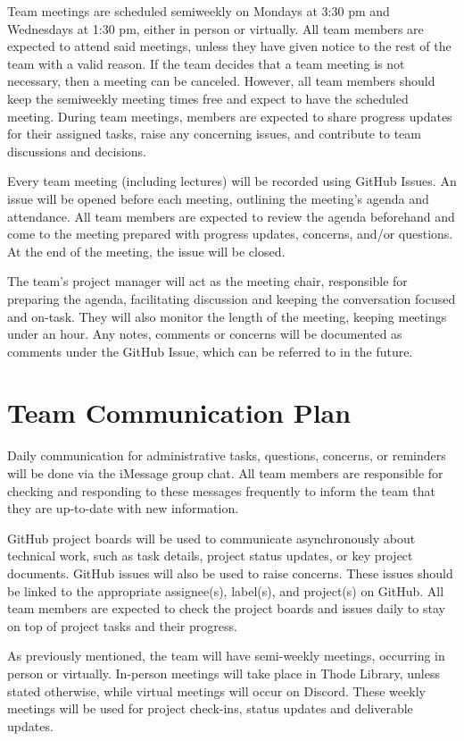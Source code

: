 \documentclass{article}
\begin{document}
	Team meetings are scheduled semiweekly on Mondays at 3:30 pm and Wednesdays at 1:30 pm, either in person or virtually. All team members are expected to attend said meetings, unless they have given notice to the rest of the team with a valid reason. If the team decides that a team meeting is not necessary, then a meeting can be canceled. However, all team members should keep the semiweekly meeting times free and expect to have the scheduled meeting. During team meetings, members are expected to share progress updates for their assigned tasks, raise any concerning issues, and contribute to team discussions and decisions.

	Every team meeting (including lectures) will be recorded using GitHub Issues. An issue will be opened before each meeting, outlining the meeting’s agenda and attendance. All team members are expected to review the agenda beforehand and come to the meeting prepared with progress updates, concerns, and/or questions. At the end of the meeting, the issue will be closed.

	The team’s project manager will act as the meeting chair, responsible for preparing the agenda, facilitating discussion and keeping the conversation focused and on-task. They will also monitor the length of the meeting, keeping meetings under an hour. Any notes, comments or concerns will be documented as comments under the GitHub Issue, which can be referred to in the future.

	\section{Team Communication Plan}

	Daily communication for administrative tasks, questions, concerns, or reminders will be done via the iMessage group chat. All team members are responsible for checking and responding to these messages frequently to inform the team that they are up-to-date with new information.

	GitHub project boards will be used to communicate asynchronously about technical work, such as task details, project status updates, or key project documents. GitHub issues will also be used to raise concerns. These issues should be linked to the appropriate assignee(s), label(s), and project(s) on GitHub. All team members are expected to check the project boards and issues daily to stay on top of project tasks and their progress.

	As previously mentioned, the team will have semi-weekly meetings, occurring in person or virtually. In-person meetings will take place in Thode Library, unless stated otherwise, while virtual meetings will occur on Discord. These weekly meetings will be used for project check-ins, status updates and deliverable updates.
\end{document}
